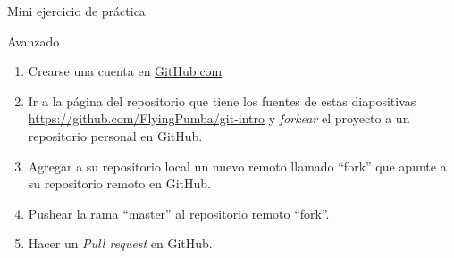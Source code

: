 \documentclass{beamer}
\begin{document}
\begin{frame}{Mini ejercicio de práctica}

	\begin{block}{Avanzado}
		\begin{enumerate}
			\item Crearse una cuenta en \url{GitHub.com}
			\item Ir a la página del repositorio que tiene los fuentes de estas diapositivas \url{https://github.com/FlyingPumba/git-intro} y \textit{forkear} el proyecto a un repositorio personal en GitHub.
			\item Agregar a su repositorio local un nuevo remoto llamado ``fork'' que apunte a su repositorio remoto en GitHub.
			\item Pushear la rama ``master'' al repositorio remoto ``fork''.
			\item Hacer un \textit{Pull request} en GitHub.
		\end{enumerate}
	\end{block}

\end{frame}
\end{document}
